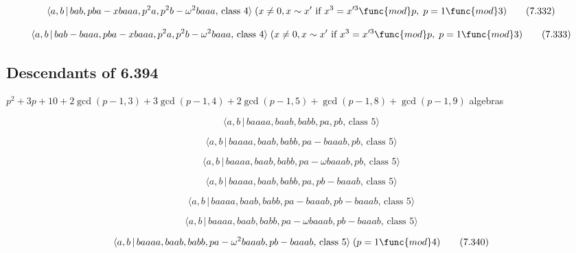 \documentclass[10pt]{article}
\begin{document}
\begin{equation}
\langle a,b\,|\,bab,pba-xbaaa,p^{2}a,p^{2}b-\omega ^{2}baaa,\,\text{class }%
4\rangle \;(x\neq 0,x \sim x^{\prime }\text{ if }x^3=x^{\prime 3}\func{mod}%
p,\;p=1\func{mod}3)  \tag{7.332}
\end{equation}

\begin{equation}
\langle a,b\,|\,bab-baaa,pba-xbaaa,p^{2}a,p^{2}b-\omega ^{2}baaa,\,\text{%
class }4\rangle \;(x\neq 0,x \sim x^{\prime }\text{ if }x^3=x^{\prime 3}%
\func{mod}p,\;p=1\func{mod}3)  \tag{7.333}
\end{equation}

\subsection{Descendants of 6.394}

$p^{2}+3p+10+2\gcd (p-1,3)+3\gcd (p-1,4)+2\gcd (p-1,5)+\gcd (p-1,8)+\gcd
(p-1,9)$ algebras

\begin{equation}
\langle a,b\,|\,baaaa,baab,babb,pa,pb,\,\text{class }5\rangle  \tag{7.334}
\end{equation}

\begin{equation}
\langle a,b\,|\,baaaa,baab,babb,pa-baaab,pb,\,\text{class }5\rangle 
\tag{7.335}
\end{equation}

\begin{equation}
\langle a,b\,|\,baaaa,baab,babb,pa-\omega baaab,pb,\,\text{class }5\rangle 
\tag{7.336}
\end{equation}

\begin{equation}
\langle a,b\,|\,baaaa,baab,babb,pa,pb-baaab,\,\text{class }5\rangle 
\tag{7.337}
\end{equation}

\begin{equation}
\langle a,b\,|\,baaaa,baab,babb,pa-baaab,pb-baaab,\,\text{class }5\rangle 
\tag{7.338}
\end{equation}

\begin{equation}
\langle a,b\,|\,baaaa,baab,babb,pa-\omega baaab,pb-baaab,\,\text{class }%
5\rangle  \tag{7.339}
\end{equation}

\begin{equation}
\langle a,b\,|\,baaaa,baab,babb,pa-\omega ^{2}baaab,pb-baaab,\,\text{class }%
5\rangle \;(p=1\func{mod}4)  \tag{7.340}
\end{equation}
\end{document}

